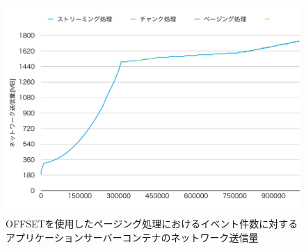 \documentclass[../../../../../main]{subfiles}
\begin{document}
    \begin{figure}[H]
        \centering
        \includegraphics[width=12cm]{graph}
        \caption{OFFSETを使用したページング処理におけるイベント件数に対するアプリケーションサーバーコンテナのネットワーク送信量}
        \label{fig:each-way-app-net-out-app_1_1024-db_1_1024}
    \end{figure}
\end{document}
